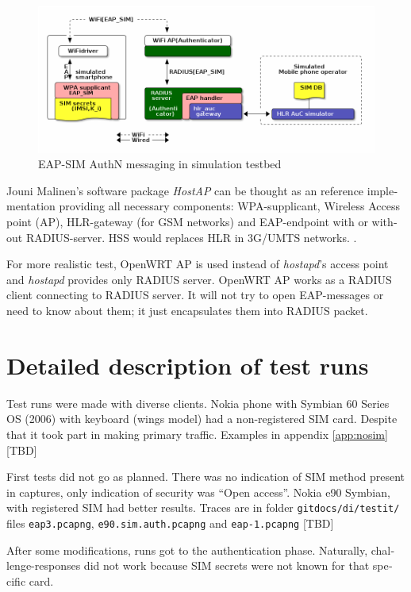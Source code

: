 \documentclass[12pt,a4paper,english]{tutthesis}
\begin{document}
\begin{otherlanguage}{english}
\begin{figure}[htb]
\centering
\includegraphics[width=.9\linewidth]{demoinfra.png}
\caption{\label{eap-sim-testbed}EAP-SIM AuthN messaging in simulation testbed}
\end{figure}




Jouni Malinen's software package \emph{HostAP} can be thought as an reference
implementation providing all necessary components: WPA-supplicant, Wireless
Access point (AP), HLR-gateway (for GSM networks) and EAP-endpoint with
or without RADIUS-server. HSS would replaces HLR in 3G/UMTS networks.
 \cite{hostapd}.

For more realistic test, OpenWRT AP is used instead of \emph{hostapd}'s
access point and \emph{hostapd} provides only RADIUS server.
OpenWRT AP works as a RADIUS client connecting to RADIUS server. 
It will not try to open EAP-messages or need
to know about them; it just encapsulates them into RADIUS packet.

\section{Detailed description of test runs}
\label{sec-5-2}






Test runs were made with diverse clients.
Nokia phone with Symbian 60 Series OS (2006) with keyboard
(wings model) had a non-registered SIM card. Despite that it took part in making
primary traffic.
Examples in appendix \ref{app:nosim}   [TBD]

First tests 
did not go as planned. There was no indication of SIM method
present in captures, only indication of security was ``Open access''.
Nokia e90 Symbian, with registered SIM had better results. Traces
are in folder \verb~gitdocs/di/testit/~ files \verb~eap3.pcapng~,
  \verb~e90.sim.auth.pcapng~ and \verb~eap-1.pcapng~  [TBD]

After some modifications, runs got to the authentication phase.
Naturally, challenge-responses did not work because SIM secrets were
not known
for that specific card.



\end{otherlanguage}
\end{document}
